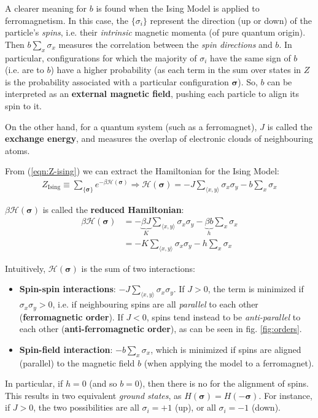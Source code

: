 \documentclass[../template.tex]{subfiles}
\begin{document}
A clearer meaning for $b$ is found when the Ising Model is applied to ferromagnetism. In this case, the $\{\sigma_i\}$ represent the direction (up or down) of the particle's \textit{spins}, i.e. their \textit{intrinsic} magnetic momenta (of pure quantum origin). Then $b \sum_x \sigma_x$ measures the correlation between the \textit{spin directions} and $b$. In particular, configurations for which the majority of $\sigma_i$ have the same sign of $b$ (i.e. are  to $b$) have a higher probability (as each term in the sum over states in $Z$ is the probability associated with a particular configuration $\bm{\sigma}$). So, $b$ can be interpreted as an \textbf{external magnetic field}, pushing each particle to align its spin to it.

On the other hand, for a quantum system (such as a ferromagnet), $J$ is called the \textbf{exchange energy}, and measures the overlap of electronic clouds of neighbouring atoms. 

\medskip

From (\ref{eqn:Z-ising}) we can extract the Hamiltonian for the Ising Model:
\begin{align}\label{eqn:H-ising}
    Z_{\mathrm{Ising}} \equiv \sum_{\{\bm{\sigma}\}} e^{-\beta \mathcal{H}(\bm{\sigma})} \Rightarrow \mathcal{H}(\bm{\sigma}) = -J \sum_{\langle x,y \rangle} \sigma_x \sigma_y - b \sum_x \sigma_x
\end{align}

$\beta \mathcal{H}(\bm{\sigma})$ is called the \textbf{reduced Hamiltonian}:
\begin{align*}
    \beta \mathcal{H}(\bm{\sigma}) &= -\underbrace{\beta J}_{K} \sum_{\langle x,y \rangle} \sigma_x \sigma_y -\underbrace{\beta b}_{h} \sum_x \sigma_x \\
    &= -K \sum_{\langle x,y \rangle} \sigma_x \sigma_y - h \sum_x \sigma_x
\end{align*}  


Intuitively, $\mathcal{H}(\bm{\sigma})$ is the sum of two interactions:
\begin{itemize}
    \item \textbf{Spin-spin interactions}: $-J \sum_{\langle x,y \rangle} \sigma_x \sigma_y$. If $J > 0$, the term is minimized if $\sigma_x \sigma_y > 0$, i.e. if neighbouring spins are all \textit{parallel} to each other (\textbf{ferromagnetic order}). If $J < 0$, spins tend instead to be \textit{anti-parallel} to each other (\textbf{anti-ferromagnetic order}), as can be seen in fig. \ref{fig:orders}. 
    \item \textbf{Spin-field interaction}: $-b \sum_x \sigma_x$, which is minimized if spins are aligned (parallel) to the magnetic field $b$ (when applying the model to a ferromagnet).  
\end{itemize}
In particular, if $h = 0$ (and so $b=0$), then there is no  for the alignment of spins. This results in two equivalent \textit{ground states}, as $H(\bm{\sigma}) = H(-\bm{\sigma})$. For instance, if $J > 0$, the two possibilities are all $\sigma_i = +1$ (up), or all $\sigma_i = -1$ (down).
\end{document}
